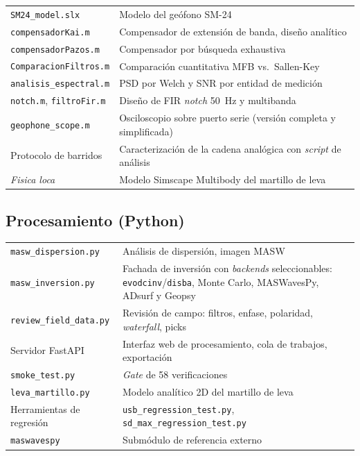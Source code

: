 \begin{center}\footnotesize
\begin{tabularx}{\textwidth}{@{}l X@{}}
\toprule
\texttt{SM24\_model.slx} & Modelo del ge\'ofono SM-24 \\
\texttt{compensadorKai.m} & Compensador de extensi\'on de banda, dise\~no anal\'itico \\
\texttt{compensadorPazos.m} & Compensador por b\'usqueda exhaustiva \\
\texttt{ComparacionFiltros.m} & Comparaci\'on cuantitativa MFB vs.\ Sallen-Key \\
\texttt{analisis\_espectral.m} & PSD por Welch y SNR por entidad de medici\'on \\
\texttt{notch.m}, \texttt{filtroFir.m} & Dise\~no de FIR \emph{notch} \SI{50}{\hertz} y multibanda \\
\texttt{geophone\_scope.m} & Osciloscopio sobre puerto serie (versi\'on completa y simplificada) \\
Protocolo de barridos & Caracterizaci\'on de la cadena anal\'ogica con \emph{script} de an\'alisis \\
\emph{Fisica loca} & Modelo Simscape Multibody del martillo de leva \\
\bottomrule
\end{tabularx}
\end{center}

\subsection{Procesamiento (Python)}

\begin{center}\footnotesize
\begin{tabularx}{\textwidth}{@{}l X@{}}
\toprule
\texttt{masw\_dispersion.py} & An\'alisis de dispersi\'on, imagen MASW \\
\texttt{masw\_inversion.py} & Fachada de inversi\'on con \emph{backends} seleccionables: \texttt{evodcinv}/\texttt{disba}, Monte Carlo, MASWavesPy, ADsurf y Geopsy \\
\texttt{review\_field\_data.py} & Revisi\'on de campo: filtros, enfase, polaridad, \emph{waterfall}, picks \\
Servidor FastAPI & Interfaz web de procesamiento, cola de trabajos, exportaci\'on \\
\texttt{smoke\_test.py} & \emph{Gate} de 58 verificaciones \\
\texttt{leva\_martillo.py} & Modelo anal\'itico 2D del martillo de leva \\
Herramientas de regresi\'on & \texttt{usb\_regression\_test.py}, \texttt{sd\_max\_regression\_test.py} \\
\texttt{maswavespy} & Subm\'odulo de referencia externo \\
\bottomrule
\end{tabularx}
\end{center}


